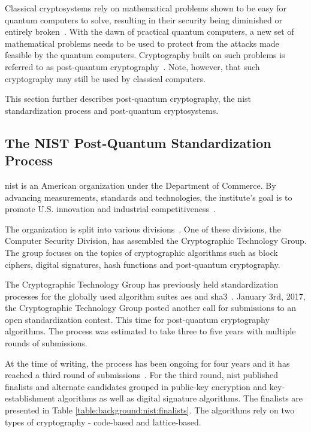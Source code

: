 Classical cryptosystems rely on mathematical problems shown to be easy for quantum computers to solve, resulting in their security being diminished or entirely broken~\cite{shor1997, jordan2021}. With the dawn of practical quantum computers, a new set of mathematical problems needs to be used to protect from the attacks made feasible by the quantum computers. Cryptography built on such problems is referred to as \gls{post-quantum} cryptography~\cite{nist:round-three-submissions}. Note, however, that such cryptography may still be used by classical computers. 

This section further describes \gls{post-quantum} cryptography, the \gls{nist} standardization process and \gls{post-quantum} cryptosystems.

\subsection{The NIST Post-Quantum Standardization Process}
\acrfull{nist} is an American organization under the Department of Commerce. By advancing measurements, standards and technologies, the institute's goal is to promote U.S. innovation and industrial competitiveness~\cite{nist:about}.

The organization is split into various divisions~\cite{nist:ct}. One of these divisions, the Computer Security Division, has assembled the Cryptographic Technology Group. The group focuses on the topics of cryptographic algorithms such as block ciphers, digital signatures, hash functions and \gls{post-quantum} cryptography.

The Cryptographic Technology Group has previously held standardization processes for the globally used algorithm suites \gls{aes} and \gls{sha3}~\cite{nist:call-for-proposals}. January 3rd, 2017, the Cryptographic Technology Group posted another call for submissions to an open standardization contest. This time for \gls{post-quantum} cryptography algorithms. The process was estimated to take three to five years with multiple rounds of submissions.

At the time of writing, the process has been ongoing for four years and it has reached a third round of submissions~\cite{nist:round-three-submissions}. For the third round, \gls{nist} published finalists and alternate candidates grouped in public-key encryption and key-establishment algorithms as well as digital signature algorithms. The finalists are presented in Table \ref{table:background:nist:finalists}. The algorithms rely on two types of cryptography - code-based and lattice-based.

